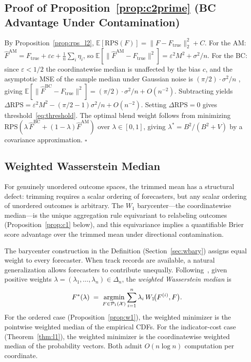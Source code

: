 \subsection*{Proof of Proposition~\ref{prop:c2prime} (BC Advantage Under Contamination)}

By Proposition~\ref{prop:rps_l2}, $\mathbb{E}[\mathrm{RPS}(F)] = \|F - F_{\mathrm{true}}\|_2^2 + C$.
For the AM: $\widehat{F}^{\mathrm{AM}} = F_{\mathrm{true}} + \varepsilon c + \frac{1}{n}\sum_i\eta_i$,
so $\mathbb{E}[\|\widehat{F}^{\mathrm{AM}} - F_{\mathrm{true}}\|^2] = \varepsilon^2 M^2 + \sigma^2/n$.
For the BC: since $\varepsilon < 1/2$ the coordinatewise median is unaffected by the bias $c$,
and the asymptotic MSE of the sample median under Gaussian noise is $(\pi/2)\cdot\sigma^2/n$
\cite{van2000asymptotic}, giving $\mathbb{E}[\|\widehat{F}^{\mathrm{BC}} - F_{\mathrm{true}}\|^2]
= (\pi/2)\cdot\sigma^2/n + O(n^{-2})$.
Subtracting yields $\Delta\mathrm{RPS} = \varepsilon^2 M^2 - (\pi/2-1)\sigma^2/n + O(n^{-2})$.
Setting $\Delta\mathrm{RPS} = 0$ gives threshold~\eqref{eq:threshold}.
The optimal blend weight follows from minimizing $\mathrm{RPS}(\lambda\,\widehat{F}^{\mathrm{BC}} + (1-\lambda)\widehat{F}^{\mathrm{AM}})$ over $\lambda\in[0,1]$, giving $\lambda^* = B^2/(B^2+V)$ by a covariance approximation. \hfill$\square$

\subsection*{Weighted Wasserstein Median}

For genuinely unordered outcome spaces, the trimmed mean has a structural defect: trimming
requires a scalar ordering of forecasters, but any scalar ordering of unordered outcomes is
arbitrary.  The $W_1$ barycenter---the coordinatewise median---is the unique
aggregation rule equivariant to relabeling outcomes (Proposition~\ref{prop:c1} below),
and this equivariance implies a quantifiable Brier score advantage over the trimmed mean
under directional contamination.

The barycenter construction in the Definition (Section~\ref{sec:wbary}) assigns equal weight
to every forecaster.  When track records are available, a natural generalization allows
forecasters to contribute unequally.  Following~\cite{carlier23}, given positive weights
$\lambda = (\lambda_1,\ldots,\lambda_n)\in\Delta_n$, the \emph{weighted Wasserstein median} is
\begin{equation}
F^*(\lambda) \;=\; \operatorname*{argmin}_{F \in \mathcal{P}_1(\mathcal{X})}
    \sum_{i=1}^n \lambda_i\, W_1\!\bigl(F^{(i)}, F\bigr).
\label{eq:weighted_wb}
\end{equation}
For the ordered case (Proposition~\ref{prop:w1}), the weighted minimizer is the pointwise
weighted median of the empirical CDFs.
For the indicator-cost case (Theorem~\ref{thm:l1}), the weighted minimizer is the coordinatewise
weighted median of the probability vectors.
Both admit $O(n\log n)$ computation per coordinate.


